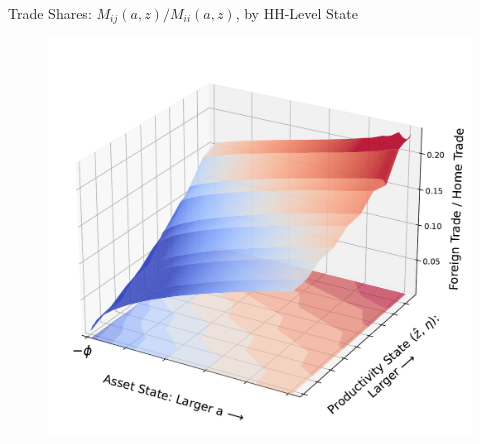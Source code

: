 \documentclass[9pt,pdftex,aspectratio=1610]{beamer}
\theoremstyle{definition}
\begin{document}
\begin{frame}[t]{Trade Shares: $M_{ij}(a,z) / M_{ii}(a,z)$, by HH-Level State}
\vspace{-.5cm}
\begin{figure}[t]
\centerline{
\includegraphics[scale = 0.5]{../notes/figures/trade-share.pdf}}
\end{figure}
\end{frame}
\end{document}
